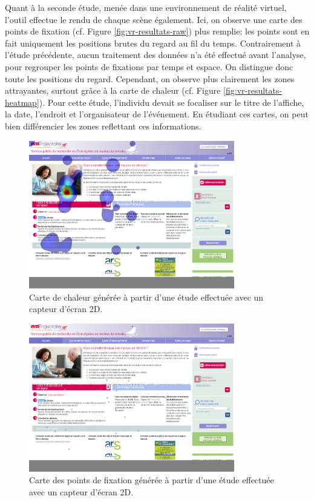 \documentclass[hidelinks,12pt]{article}
\begin{document}
\bigskip
Quant à la seconde étude, menée dans une environnement de réalité virtuel,
l'outil effectue le rendu de chaque scène également. Ici, on observe une carte
des points de fixation (cf. Figure \ref{fig:vr-resultats-raw}) plus remplie:
les points sont en fait uniquement les positions brutes du regard au fil du
temps. Contrairement à l'étude précédente, aucun traitement des données n'a été
effectué avant l'analyse, pour regrouper les points de fixations par temps et
espace. On distingue donc toute les positions du regard. Cependant, on observe
plus clairement les zones attrayantes, surtout grâce à la carte de chaleur (cf.
Figure \ref{fig:vr-resultats-heatmap}). Pour cette étude, l'individu devait se
focaliser sur le titre de l'affiche, la date, l'endroit et l'organisateur de
l'événement. En étudiant ces cartes, on peut bien différencier les zones
reflettant ces informations.

\begin{figure}[htpb]
  \centering
  \includegraphics[width=0.8\textwidth,keepaspectratio=true]{tea-heatmap-9.png}
  \caption{Carte de chaleur générée à partir d'une étude effectuée avec un
    capteur d'écran 2D.}
  \label{fig:tea-resultats-heatmap}
\end{figure}

\begin{figure}[htpb]
  \centering
  \includegraphics[width=0.8\textwidth,keepaspectratio=true]{tea-raw-9.png}
  \caption{Carte des points de fixation générée à partir d'une étude effectuée
    avec un capteur d'écran 2D.}
  \label{fig:tea-resultats-raw}
\end{figure}
\end{document}
